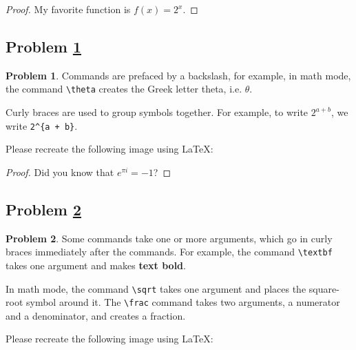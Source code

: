 \documentclass[11pt]{article}
\theoremstyle{definition}
\theoremstyle{definition}
\newtheorem{required}{Problem}
\theoremstyle{definition}
\begin{document}
\begin{proof}My favorite function is $f(x) = 2^x$.
\end{proof}



\newpage
\subsection{Problem \ref{Latex2}} 
\begin{required} \label{Latex2}
Commands are prefaced by a backslash, for example, in math mode, the command \texttt{\textbackslash theta} creates the Greek letter theta, i.e. $\theta$.

Curly braces are used to group symbols together. For example, to write $2^{a + b}$, we write \texttt{2\^{}\{a + b\}}.

Please recreate the following image using \LaTeX:

\end{required}

\begin{proof} Did you know that $e^{\pi i} = -1$?
\end{proof}



\newpage
\subsection{Problem \ref{Latex3}}
\begin{required} \label{Latex3}
Some commands take one or more arguments, which go in curly braces immediately after the commands. For example, the command \texttt{\textbackslash textbf} takes one argument and makes \textbf{text bold}.

In math mode, the command \texttt{\textbackslash sqrt} takes one argument and places the square-root symbol around it. The \texttt{\textbackslash frac} command takes two arguments, a numerator and a denominator, and creates a fraction.

Please recreate the following image using \LaTeX:

\end{required}
\end{document}
